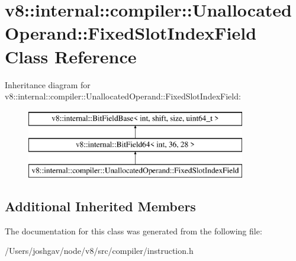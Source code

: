 \hypertarget{classv8_1_1internal_1_1compiler_1_1_unallocated_operand_1_1_fixed_slot_index_field}{}\section{v8\+:\+:internal\+:\+:compiler\+:\+:Unallocated\+Operand\+:\+:Fixed\+Slot\+Index\+Field Class Reference}
\label{classv8_1_1internal_1_1compiler_1_1_unallocated_operand_1_1_fixed_slot_index_field}
Inheritance diagram for v8\+:\+:internal\+:\+:compiler\+:\+:Unallocated\+Operand\+:\+:Fixed\+Slot\+Index\+Field\+:\begin{figure}[H]
\begin{center}
\leavevmode
\includegraphics[height=3.000000cm]{classv8_1_1internal_1_1compiler_1_1_unallocated_operand_1_1_fixed_slot_index_field}
\end{center}
\end{figure}
\subsection*{Additional Inherited Members}


The documentation for this class was generated from the following file\+:\begin{DoxyCompactItemize}
\item 
/\+Users/joshgav/node/v8/src/compiler/instruction.\+h\end{DoxyCompactItemize}
